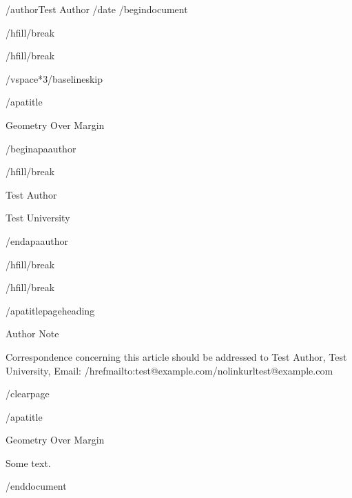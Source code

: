 /author{Test Author}
/date{}
/begin{document}


/hfill/break

/hfill/break

/vspace*{3/baselineskip}

/apatitle{

Geometry Over Margin

}

/begin{apaauthor}

/hfill/break

Test Author

Test University

/end{apaauthor}

/hfill/break

/hfill/break

/apatitlepageheading{

Author Note

}

Correspondence concerning this article should be addressed to Test
Author, Test University, Email:
/href{mailto:test@example.com}{/nolinkurl{test@example.com}}

/clearpage

/apatitle{

Geometry Over Margin

}

Some text.




/end{document}
